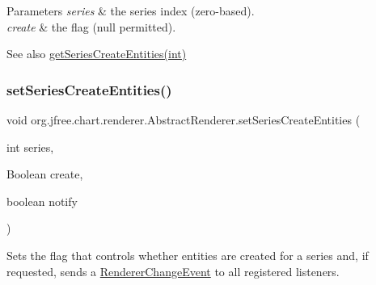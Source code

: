 \begin{DoxyParams}{Parameters}
{\em series} & the series index (zero-\/based). \\
\hline
{\em create} & the flag ({\ttfamily null} permitted).\\
\hline
\end{DoxyParams}
\begin{DoxySeeAlso}{See also}
\mbox{\hyperlink{classorg_1_1jfree_1_1chart_1_1renderer_1_1_abstract_renderer_ab00f0025b38b9114f5fb3fded82628e7}{get\+Series\+Create\+Entities(int)}} 
\end{DoxySeeAlso}
\mbox{\label{classorg_1_1jfree_1_1chart_1_1renderer_1_1_abstract_renderer_a8b650c74a558f281a55ea4bc9f708031}} 
\subsubsection{\texorpdfstring{set\+Series\+Create\+Entities()}{setSeriesCreateEntities()}\hspace{0.1cm}{\footnotesize\ttfamily [2/2]}}
{\footnotesize\ttfamily void org.\+jfree.\+chart.\+renderer.\+Abstract\+Renderer.\+set\+Series\+Create\+Entities (\begin{DoxyParamCaption}\item[{int}]{series,  }\item[{Boolean}]{create,  }\item[{boolean}]{notify }\end{DoxyParamCaption})}

Sets the flag that controls whether entities are created for a series and, if requested, sends a \mbox{\hyperlink{}{Renderer\+Change\+Event}} to all registered listeners.


